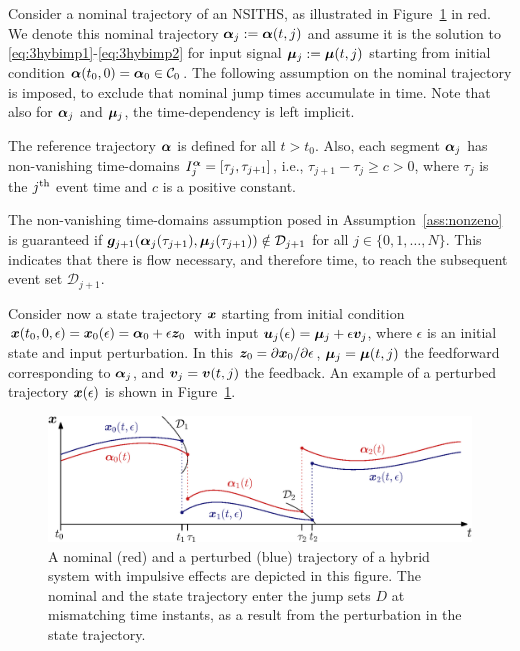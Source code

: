 \documentclass[../DC2019003Bouma.tex]{subfiles}
\begin{document}
Consider a nominal trajectory of an NSITHS, as illustrated in Figure~\ref{fig:3perturbedtraj} in red. We denote this nominal trajectory $\boldsymbol{\alpha}_j:=\boldsymbol{\alpha}(t,j)$ and assume it is the solution to \eqref{eq:3hybimp1}-\eqref{eq:3hybimp2} for input signal $\boldsymbol{\mu}_j:=\boldsymbol{\mu}(t,j)$ starting from initial condition $\boldsymbol{\alpha}(t_0,0)=\boldsymbol{\alpha}_0\in \mathcal{C}_0$. The following assumption on the nominal trajectory is imposed, to exclude that nominal jump times accumulate in time. Note that also for $\boldsymbol{\alpha}_j$ and $\boldsymbol{\mu}_j$, the time-dependency is left implicit.

\begin{sloppypar}
\begin{myass}
The reference trajectory $\boldsymbol{\alpha}$ is defined for all $t>t_0$. Also, each segment $\boldsymbol{\alpha}_j$ has non-vanishing time-domains $I^{\boldsymbol{\alpha}}_j=[\tau_j,\tau_{j+1}]$, i.e., $\tau_{j+1}-\tau_j\geq c > 0$, where $\tau_j$ is the $j^{\textnormal{th}}$ event time and $c$ is a positive constant.\label{ass:nonzeno}
\end{myass}
\end{sloppypar}

\begin{sloppypar}
\begin{myremark}
The non-vanishing time-domains assumption posed in Assumption~\ref{ass:nonzeno} is guaranteed if ${\boldsymbol{g}}_{j+1}(\boldsymbol{\alpha}_j(\tau_{j+1}),\boldsymbol{\mu}_j(\tau_{j+1}))\notin \mathcal{D}_{j+1}$ for all $j\in\{0,1,\dots,N\}$. This indicates that there is flow necessary, and therefore time, to reach the subsequent event set $\mathcal{D}_{j+1}$. 
\end{myremark}
\end{sloppypar}
Consider now a state trajectory ${\boldsymbol{x}}$ starting from initial condition ${\boldsymbol{x}}(t_0,0,\epsilon)={\boldsymbol{x}}_0(\epsilon)=\boldsymbol{\alpha}_0+\epsilon {\boldsymbol{z}}_0$ with input ${\boldsymbol{u}}_j(\epsilon)=\boldsymbol{\mu}_j+\epsilon {\boldsymbol{v}}_j$, where $\epsilon$ is an initial state and input perturbation. In this ${\boldsymbol{z}}_0 = \partial{\boldsymbol{x}}_0 / \partial\epsilon$, $\boldsymbol{\mu}_j = \boldsymbol{\mu}(t,j)$ the feedforward corresponding to $\boldsymbol{\alpha}_j$, and ${\boldsymbol{v}}_j = {\boldsymbol{v}}(t,j)$ the feedback. An example of a perturbed trajectory ${\boldsymbol{x}}(\epsilon)$ is shown in Figure~\ref{fig:3perturbedtraj}.

%
%
\begin{figure}[bt!]
\centering
\includegraphics[width=.9\textwidth]{perturbedtraj.eps}\caption{A nominal (red) and a perturbed (blue) trajectory of a hybrid system with impulsive effects are depicted in this figure. The nominal and the state trajectory enter the jump sets $D$ at mismatching time instants, as a result from the perturbation in the state trajectory.} \label{fig:3perturbedtraj}
\end{figure}
\end{document}
